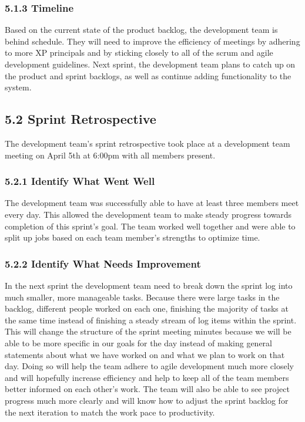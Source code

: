 \documentclass[]{article}
\begin{document}
\subsubsection{5.1.3 Timeline}\label{timeline}

Based on the current state of the product backlog, the development team
is behind schedule. They will need to improve the efficiency of meetings
by adhering to more XP principals and by sticking closely to all of the
scrum and agile development guidelines. Next sprint, the development
team plans to catch up on the product and sprint backlogs, as well as
continue adding functionality to the system.

\subsection{5.2 Sprint Retrospective}\label{sprint-retrospective}

The development team's sprint retrospective took place at a development
team meeting on April 5th at 6:00pm with all members present.

\subsubsection{5.2.1 Identify What Went
Well}\label{identify-what-went-well}

The development team was successfully able to have at least three
members meet every day. This allowed the development team to make steady
progress towards completion of this sprint's goal. The team worked well
together and were able to split up jobs based on each team member's
strengths to optimize time.

\subsubsection{5.2.2 Identify What Needs
Improvement}\label{identify-what-needs-improvement}

In the next sprint the development team need to break down the sprint
log into much smaller, more manageable tasks. Because there were large
tasks in the backlog, different people worked on each one, finishing the
majority of tasks at the same time instead of finishing a steady stream
of log items within the sprint. This will change the structure of the
sprint meeting minutes because we will be able to be more specific in
our goals for the day instead of making general statements about what we
have worked on and what we plan to work on that day. Doing so will help
the team adhere to agile development much more closely and will
hopefully increase efficiency and help to keep all of the team members
better informed on each other's work. The team will also be able to see
project progress much more clearly and will know how to adjust the
sprint backlog for the next iteration to match the work pace to
productivity.
\end{document}
